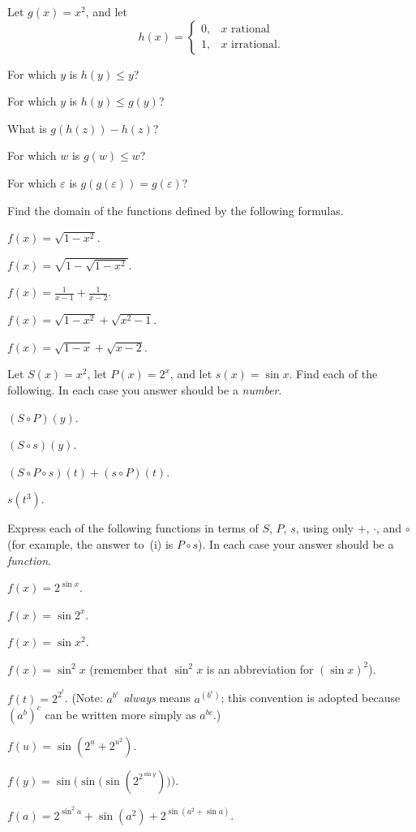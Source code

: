  Let $g(x)=x^2$, and let
\[
h(x) =
\begin{cases}
0, & x\text{ rational}\\
1, & x\text{ irrational.}
\end{cases}
\]
\begin{romans}
\item For which $y$ is $h(y) \leq y$?
\item For which $y$ is $h(y) \leq g(y)$?
\item What is $g(h(z)) - h(z)$?
\item For which $w$ is $g(w) \leq w$?
\item For which $\varepsilon$ is $g(g(\varepsilon)) = g(\varepsilon)$?
\end{romans}

 Find the domain of the functions defined by the following formulas.
\begin{romans}
\item $f(x) = \sqrt{1-x^2}$.
\item $f(x) = \sqrt{1 - \sqrt{1-x^2}}$.
\item $\displaystyle f(x) = \frac{1}{x-1} + \frac{1}{x-2}$.
\item $f(x) = \sqrt{1-x^2} + \sqrt{x^2-1}$.
\item $f(x) = \sqrt{1-x} + \sqrt{x-2}$.
\end{romans}

 Let $S(x)=x^2$, let $P(x)=2^x$, and let $s(x)=\sin x$. Find each of
the following. In each case you answer should be a \emph{number}.
\begin{romans}
\item $(S \circ P)(y)$.
\item $(S \circ s)(y)$.
\item $(S \circ P \circ s)(t) + (s \circ P)(t)$.
\item $s(t^3)$.
\end{romans}

 Express each of the following functions in terms of $S$, $P$, $s$,
using only $+$, $\cdot$, and $\circ$ (for example, the answer to~(i) is
$P \circ s$). In each case your answer should be a \emph{function}.
\begin{romans}
\item $f(x) = 2^{\sin x}$.
\item $f(x) = \sin 2^x$.
\item $f(x) = \sin x^2$.
\item $f(x) = \sin^2 x$ (remember that $\sin^2 x$ is an abbreviation for
$(\sin x)^2$).
\item $f(t) = 2^{2^t}$. (Note: $a^{b^c}$ \emph{always} means $a^{(b^c)}$; this
convention is adopted because $(a^b)^c$ can be written more simply as
$a^{bc}$.)
\item $f(u) = \sin(2^u + 2^{u^2})$.
\item $f(y) = \sin\bigl(\sin\bigl(\sin(2^{2^{\sin y}})\bigr)\bigr)$.
\item $f(a) = 2^{\sin^2 a} + \sin(a^2) + 2^{\sin(a^2 + \sin a)}$.
\end{romans}

